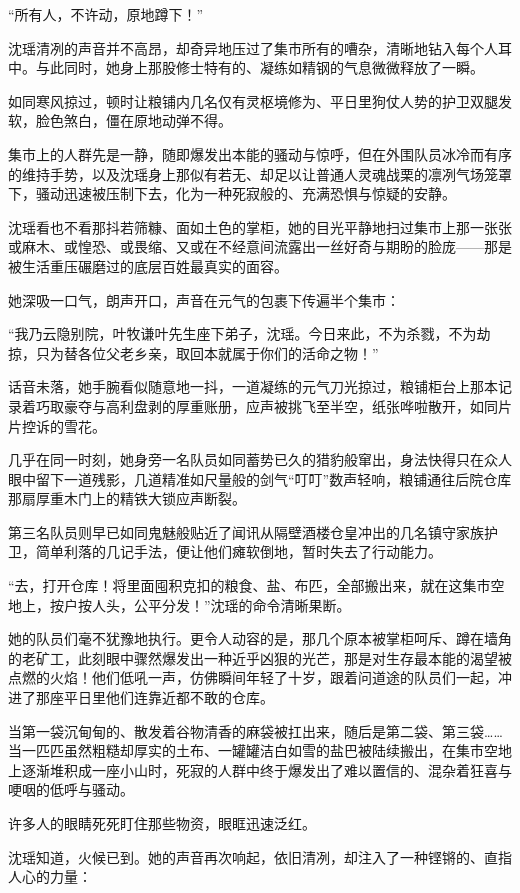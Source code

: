 “所有人，不许动，原地蹲下！”

沈瑶清冽的声音并不高昂，却奇异地压过了集市所有的嘈杂，清晰地钻入每个人耳中。与此同时，她身上那股修士特有的、凝练如精钢的气息微微释放了一瞬。

如同寒风掠过，顿时让粮铺内几名仅有灵枢境修为、平日里狗仗人势的护卫双腿发软，脸色煞白，僵在原地动弹不得。

集市上的人群先是一静，随即爆发出本能的骚动与惊呼，但在外围队员冰冷而有序的维持手势，以及沈瑶身上那似有若无、却足以让普通人灵魂战栗的凛冽气场笼罩下，骚动迅速被压制下去，化为一种死寂般的、充满恐惧与惊疑的安静。

沈瑶看也不看那抖若筛糠、面如土色的掌柜，她的目光平静地扫过集市上那一张张或麻木、或惶恐、或畏缩、又或在不经意间流露出一丝好奇与期盼的脸庞——那是被生活重压碾磨过的底层百姓最真实的面容。

她深吸一口气，朗声开口，声音在元气的包裹下传遍半个集市：

“我乃云隐别院，叶牧谦叶先生座下弟子，沈瑶。今日来此，不为杀戮，不为劫掠，只为替各位父老乡亲，取回本就属于你们的活命之物！”

话音未落，她手腕看似随意地一抖，一道凝练的元气刀光掠过，粮铺柜台上那本记录着巧取豪夺与高利盘剥的厚重账册，应声被挑飞至半空，纸张哗啦散开，如同片片控诉的雪花。

几乎在同一时刻，她身旁一名队员如同蓄势已久的猎豹般窜出，身法快得只在众人眼中留下一道残影，几道精准如尺量般的剑气“叮叮”数声轻响，粮铺通往后院仓库那扇厚重木门上的精铁大锁应声断裂。

第三名队员则早已如同鬼魅般贴近了闻讯从隔壁酒楼仓皇冲出的几名镇守家族护卫，简单利落的几记手法，便让他们瘫软倒地，暂时失去了行动能力。

“去，打开仓库！将里面囤积克扣的粮食、盐、布匹，全部搬出来，就在这集市空地上，按户按人头，公平分发！”沈瑶的命令清晰果断。

她的队员们毫不犹豫地执行。更令人动容的是，那几个原本被掌柜呵斥、蹲在墙角的老矿工，此刻眼中骤然爆发出一种近乎凶狠的光芒，那是对生存最本能的渴望被点燃的火焰！他们低吼一声，仿佛瞬间年轻了十岁，跟着问道途的队员们一起，冲进了那座平日里他们连靠近都不敢的仓库。

当第一袋沉甸甸的、散发着谷物清香的麻袋被扛出来，随后是第二袋、第三袋……当一匹匹虽然粗糙却厚实的土布、一罐罐洁白如雪的盐巴被陆续搬出，在集市空地上逐渐堆积成一座小山时，死寂的人群中终于爆发出了难以置信的、混杂着狂喜与哽咽的低呼与骚动。

许多人的眼睛死死盯住那些物资，眼眶迅速泛红。

沈瑶知道，火候已到。她的声音再次响起，依旧清冽，却注入了一种铿锵的、直指人心的力量：

